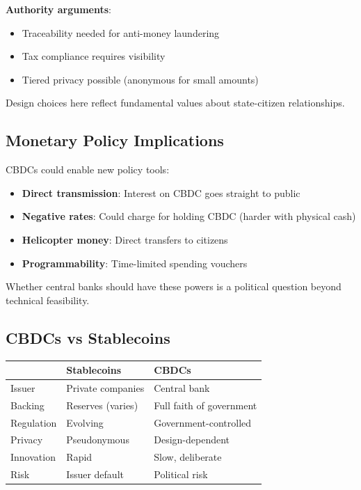 \documentclass[11pt,a4paper]{article}
\begin{document}
\textbf{Authority arguments}:
\begin{itemize}
    \item Traceability needed for anti-money laundering
    \item Tax compliance requires visibility
    \item Tiered privacy possible (anonymous for small amounts)
\end{itemize}

Design choices here reflect fundamental values about state-citizen relationships.

\subsection{Monetary Policy Implications}

CBDCs could enable new policy tools:
\begin{itemize}
    \item \textbf{Direct transmission}: Interest on CBDC goes straight to public
    \item \textbf{Negative rates}: Could charge for holding CBDC (harder with physical cash)
    \item \textbf{Helicopter money}: Direct transfers to citizens
    \item \textbf{Programmability}: Time-limited spending vouchers
\end{itemize}

Whether central banks should have these powers is a political question beyond technical feasibility.

\subsection{CBDCs vs Stablecoins}

\begin{center}
\begin{tabular}{lll}
\toprule
& \textbf{Stablecoins} & \textbf{CBDCs} \\
\midrule
Issuer & Private companies & Central bank \\
Backing & Reserves (varies) & Full faith of government \\
Regulation & Evolving & Government-controlled \\
Privacy & Pseudonymous & Design-dependent \\
Innovation & Rapid & Slow, deliberate \\
Risk & Issuer default & Political risk \\
\bottomrule
\end{tabular}
\end{center}
\end{document}
